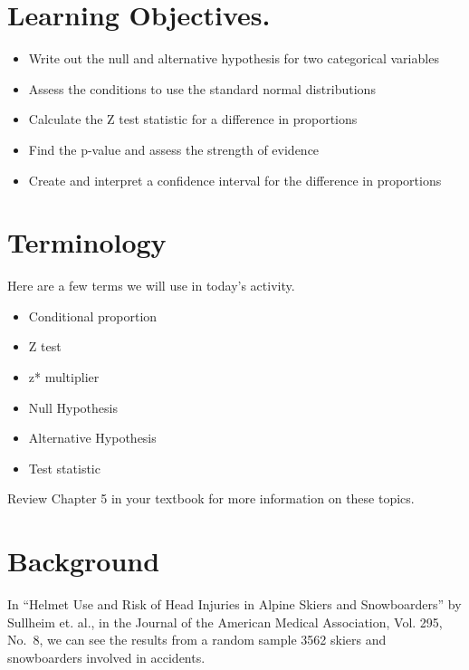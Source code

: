 \documentclass[
]{report}
\begin{document}
\hypertarget{learning-objectives.}{%
\section{Learning Objectives.}\label{learning-objectives.}}

\begin{itemize}
\item
  Write out the null and alternative hypothesis for two categorical variables
\item
  Assess the conditions to use the standard normal distributions
\item
  Calculate the Z test statistic for a difference in proportions
\item
  Find the p-value and assess the strength of evidence
\item
  Create and interpret a confidence interval for the difference in proportions
\end{itemize}

\hypertarget{terminology}{%
\section{Terminology}\label{terminology}}

Here are a few terms we will use in today's activity.

\begin{itemize}
\item
  Conditional proportion
\item
  Z test
\item
  z* multiplier
\item
  Null Hypothesis
\item
  Alternative Hypothesis
\item
  Test statistic
\end{itemize}

Review Chapter 5 in your textbook for more information on these topics.

\hypertarget{background}{%
\section{Background}\label{background}}

In ``Helmet Use and Risk of Head Injuries in Alpine Skiers and Snowboarders'' by Sullheim et. al., in the Journal of the American Medical Association, Vol. 295, No.~8, we can see the results from a random sample 3562 skiers and snowboarders involved in accidents.
\end{document}
